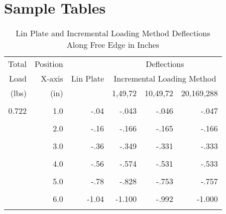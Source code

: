 \chapter{Sample Tables}
\label{chap:sample_tables}

\begin{table}[tbp]
  \caption{Lin Plate and Incremental Loading Method Deflections Along Free Edge in Inches}
  \label{tab:LinPlate}
  \centering
  \begin{tabular}{rrrrrr} \hline
    Total & Position & \multirow{3}{*}{Lin Plate} & \multicolumn{3}{c}{Deflections} \\
    Load & X-axis & & \multicolumn{3}{c}{Incremental Loading Method} \\
    (lbs) & (in) & & 1,49,72 & 10,49,72 & 20,169,288 \\
    \hline
    \\
    0.722 & 1.0 & -.04 & -.043 & -.046 & -.047 \\
    \\
    & 2.0 & -.16 & -.166 & -.165 & -.166 \\
    \\
    & 3.0 & -.36 & -.349 & -.331 & -.333 \\
    \\
    & 4.0 & -.56 & -.574 & -.531 & -.533 \\
    \\
    & 5.0 & -.78 & -.828 & -.753 & -.757 \\
    \\
    & 6.0 & -1.04 & -1.100 & -.992 & -1.000 \\
    \\ \hline
  \end{tabular}
\end{table}

